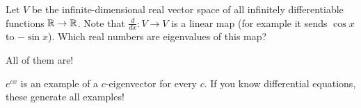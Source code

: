 \begin{problem}
	Let $V$ be the infinite-dimensional real vector space of all
	infinitely differentiable functions $\mathbb R \to \mathbb R$.
	Note that $\frac{d}{dx} \colon V \to V$ is a linear map
	(for example it sends $\cos x$ to $-\sin x$).
	Which real numbers are eigenvalues of this map?
	\begin{hint}
		All of them are!
	\end{hint}
	\begin{sol}
		$e^{cx}$ is an example of a $c$-eigenvector for every $c$.
		If you know differential equations,
		these generate all examples!
	\end{sol}
\end{problem}
